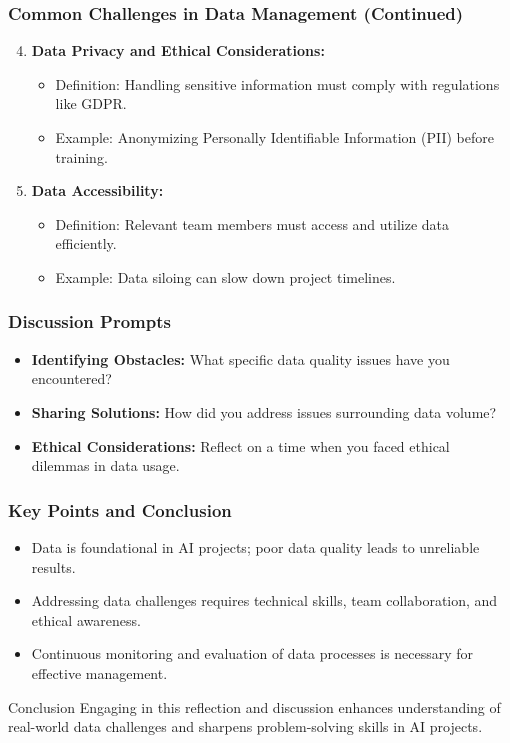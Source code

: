 \documentclass[aspectratio=169]{beamer}
\begin{document}
\begin{frame}[fragile]
    \frametitle{Common Challenges in Data Management (Continued)}
    \begin{enumerate}
        \setcounter{enumi}{3} %
        \item \textbf{Data Privacy and Ethical Considerations:}
            \begin{itemize}
                \item Definition: Handling sensitive information must comply with regulations like GDPR.
                \item Example: Anonymizing Personally Identifiable Information (PII) before training.
            \end{itemize}
        \item \textbf{Data Accessibility:}
            \begin{itemize}
                \item Definition: Relevant team members must access and utilize data efficiently.
                \item Example: Data siloing can slow down project timelines.
            \end{itemize}
    \end{enumerate}
\end{frame}

\begin{frame}[fragile]
    \frametitle{Discussion Prompts}
    \begin{itemize}
        \item \textbf{Identifying Obstacles:} What specific data quality issues have you encountered?
        \item \textbf{Sharing Solutions:} How did you address issues surrounding data volume?
        \item \textbf{Ethical Considerations:} Reflect on a time when you faced ethical dilemmas in data usage. 
    \end{itemize}
\end{frame}

\begin{frame}[fragile]
    \frametitle{Key Points and Conclusion}
    \begin{itemize}
        \item Data is foundational in AI projects; poor data quality leads to unreliable results.
        \item Addressing data challenges requires technical skills, team collaboration, and ethical awareness.
        \item Continuous monitoring and evaluation of data processes is necessary for effective management.
    \end{itemize}
    \begin{block}{Conclusion}
        Engaging in this reflection and discussion enhances understanding of real-world data challenges and sharpens problem-solving skills in AI projects.
    \end{block}
\end{frame}
\end{document}
